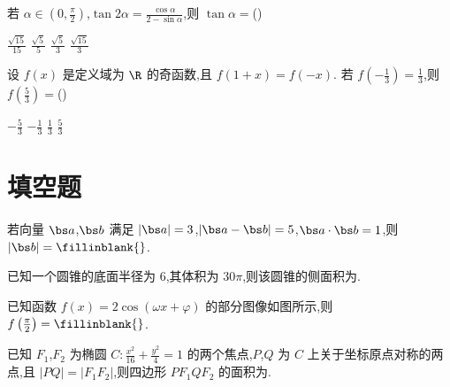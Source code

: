 \begin{problem}
若 \(\alpha\in\left(0,\frac{\pi}{2}\right)\),\(\tan 2\alpha=\frac{\cos\alpha}{2-\sin\alpha}\),则 \(\tan\alpha=\)(\quad)

\choices
    {\(\frac{\sqrt{15}}{15}\)}
    {\(\frac{\sqrt{5}}{5}\)}
    {\(\frac{\sqrt{5}}{3}\)}
    {\(\frac{\sqrt{15}}{3}\)}

\end{problem}

\begin{problem}
设 \(f(x)\) 是定义域为 \(\R\) 的奇函数,且 \(f(1+x)=f(-x)\). 若 \(f\left(-\frac{1}{3}\right)=\frac{1}{3}\),则 \(f\left(\frac{5}{3}\right)=\)(\quad)

\choices
    {\(-\frac{5}{3}\)}
    {\(-\frac{1}{3}\)}
    {\(\frac{1}{3}\)}
    {\(\frac{5}{3}\)}

\end{problem}

\section{填空题}

\begin{problem}
若向量 \(\bs a\),\(\bs b\) 满足 \(|\bs a|=3\),\(|\bs a-\bs b|=5\),\(\bs a\cdot\bs b=1\),则 \(|\bs b|=\fillinblank{}\).

\end{problem}

\begin{problem}
已知一个圆锥的底面半径为 \(6\),其体积为 \(30\pi\),则该圆锥的侧面积为\fillinblank{}.

\end{problem}

\begin{problem}
已知函数 \(f(x)=2\cos(\omega x+\varphi)\) 的部分图像如图所示,则 \(f\left(\frac{\pi}{2}\right)=\fillinblank{}\).


\end{problem}

\begin{problem}
已知 \(F_1\),\(F_2\) 为椭圆 \(C:\frac{x^2}{16}+\frac{y^2}{4}=1\) 的两个焦点,\(P\),\(Q\) 为 \(C\) 上关于坐标原点对称的两点,且 \(|PQ|=|F_1F_2|\),则四边形 \(PF_1QF_2\) 的面积为\fillinblank{}.

\end{problem}

